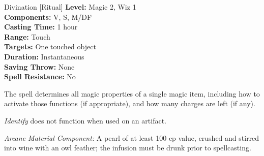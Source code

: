 {Divination [Ritual]}
{
	\textbf{Level:}
	Magic 2, Wiz 1\\
	\textbf{Components:}
	V, S, M/DF\\
	\textbf{Casting Time:}
	1 hour\\
	\textbf{Range:}
	Touch\\
	\textbf{Targets:}
	One touched object\\
	\textbf{Duration:}
	Instantaneous\\
	\textbf{Saving Throw:}
	None\\
	\textbf{Spell Resistance:}
	No\\
}
{
	The spell determines all magic properties of a single magic item, including how to activate those functions (if appropriate), and how many charges are left (if any).

	\emph{Identify} does not function when used on an artifact.

	\textit{Arcane Material Component:}
	A pearl of at least 100 cp value, crushed and stirred into wine with an owl feather; the infusion must be drunk prior to spellcasting.

}
